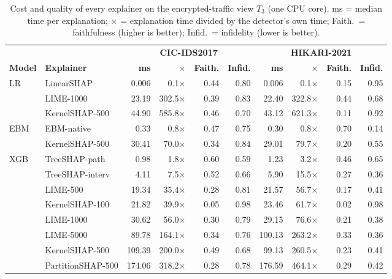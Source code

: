 \begin{table}[!htbp]
\centering
\caption{Cost and quality of every explainer on the encrypted-traffic view $T_3$ (one CPU core). ms = median time per explanation; $\times$ = explanation time divided by the detector's own time; Faith.\ = faithfulness (higher is better); Infid.\ = infidelity (lower is better).}
\label{tab:costfid}
\scriptsize
\setlength{\tabcolsep}{3pt}
\begin{tabular}{llrrrr@{\hspace{10pt}}rrrr}
\toprule
 & & \multicolumn{4}{c}{\textbf{CIC-IDS2017}} & \multicolumn{4}{c}{\textbf{HIKARI-2021}} \\
\cmidrule(lr){3-6}\cmidrule(lr){7-10}
\textbf{Model} & \textbf{Explainer} & \textbf{ms} & $\boldsymbol{\times}$ & \textbf{Faith.} & \textbf{Infid.} & \textbf{ms} & $\boldsymbol{\times}$ & \textbf{Faith.} & \textbf{Infid.} \\
\midrule
LR & LinearSHAP & 0.006 & 0.1$\times$ & 0.44 & 0.80 & 0.006 & 0.1$\times$ & 0.15 & 0.95 \\
 & LIME-1000 & 23.19 & 302.5$\times$ & 0.39 & 0.83 & 22.40 & 322.8$\times$ & 0.44 & 0.68 \\
 & KernelSHAP-500 & 44.90 & 585.8$\times$ & 0.46 & 0.70 & 43.12 & 621.3$\times$ & 0.11 & 0.92 \\
\midrule
EBM & EBM-native & 0.33 & 0.8$\times$ & 0.47 & 0.75 & 0.30 & 0.8$\times$ & 0.70 & 0.14 \\
 & KernelSHAP-500 & 30.41 & 70.0$\times$ & 0.34 & 0.84 & 29.01 & 79.7$\times$ & 0.20 & 0.55 \\
\midrule
XGB & TreeSHAP-path & 0.98 & 1.8$\times$ & 0.60 & 0.59 & 1.23 & 3.2$\times$ & 0.46 & 0.65 \\
 & TreeSHAP-interv & 4.11 & 7.5$\times$ & 0.52 & 0.66 & 5.90 & 15.5$\times$ & 0.27 & 0.36 \\
 & LIME-500 & 19.34 & 35.4$\times$ & 0.28 & 0.81 & 21.57 & 56.7$\times$ & 0.17 & 0.41 \\
 & KernelSHAP-100 & 21.82 & 39.9$\times$ & 0.05 & 0.98 & 23.46 & 61.7$\times$ & 0.02 & 0.98 \\
 & LIME-1000 & 30.62 & 56.0$\times$ & 0.30 & 0.79 & 29.15 & 76.6$\times$ & 0.21 & 0.38 \\
 & LIME-5000 & 89.78 & 164.1$\times$ & 0.34 & 0.76 & 100.13 & 263.2$\times$ & 0.33 & 0.36 \\
 & KernelSHAP-500 & 109.39 & 200.0$\times$ & 0.49 & 0.68 & 99.13 & 260.5$\times$ & 0.23 & 0.41 \\
 & PartitionSHAP-500 & 174.06 & 318.2$\times$ & 0.28 & 0.78 & 176.59 & 464.1$\times$ & 0.29 & 0.42 \\

\end{tabular}
\end{table}
